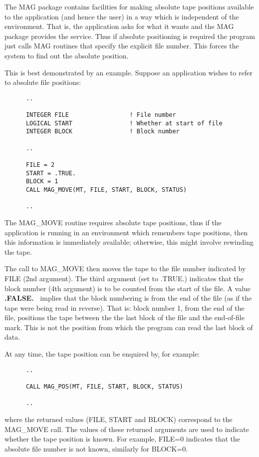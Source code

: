 The MAG package contains facilities for making absolute tape positions
available to the application (and hence the user) in a  way which is
independent of the environment. That is, the application asks for what
it wants and the MAG package provides the service. Thus if absolute
positioning is required the program just calls MAG routines that
specify the explicit file number. This forces the system to find
out the absolute position.

This is best demonstrated by an example. Suppose an application wishes
to refer to absolute file positions:

\small
\begin{verbatim}
      ..

      INTEGER FILE                 ! File number
      LOGICAL START                ! Whether at start of file
      INTEGER BLOCK                ! Block number

      ..

      FILE = 2
      START = .TRUE.
      BLOCK = 1
      CALL MAG_MOVE(MT, FILE, START, BLOCK, STATUS)

      ..
\end{verbatim}
\normalsize

The MAG\_MOVE routine requires absolute tape positions, thus if the
application is running in an environment which remembers tape positions,
then this information is immediately available;  otherwise, this might
involve rewinding the tape.

The call to MAG\_MOVE then moves the tape to the file number indicated by
FILE (2nd argument).
The third argument (set to .TRUE.) indicates that the block number
(4th argument) is to be counted from the start of the file.
A value {\bf .FALSE.\ } implies that the block numbering is from the end of the
file (as if the tape were being read in reverse). That is: block number 1,
from the end of the file, positions the tape between the the last block of
the file and the end-of-file mark. This is not the position from which the
program can read the last block of data.

At any time, the tape position can be enquired by, for example:

\small
\begin{verbatim}
      ..

      CALL MAG_POS(MT, FILE, START, BLOCK, STATUS)

      ..
\end{verbatim}
\normalsize

where the returned values (FILE, START and BLOCK) correspond to the
MAG\_MOVE call. The values of these returned arguments are used to
indicate whether the tape position is known. For example, FILE=0
indicates that the absolute file number is not known, similarly for
BLOCK=0.


